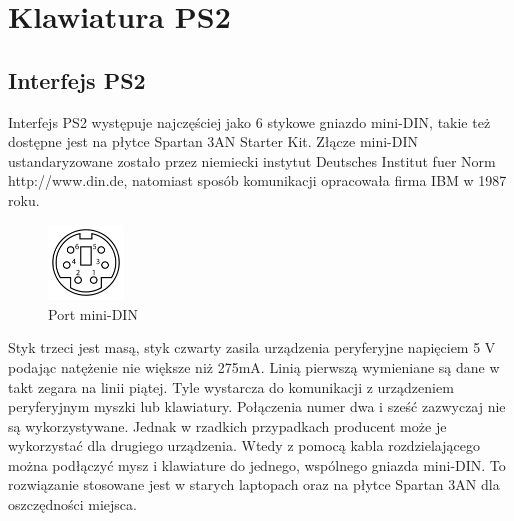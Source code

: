 \documentclass[a4paper,12pt]{article}
\begin{document}



\newpage
\section{Klawiatura PS2}

\subsection{Interfejs PS2}

Interfejs PS2 występuje najczęściej jako 6 stykowe gniazdo mini-DIN, takie też dostępne jest na płytce Spartan 3AN Starter Kit. Złącze mini-DIN ustandaryzowane zostało przez niemiecki instytut Deutsches Institut fuer Norm http://www.din.de, natomiast sposób komunikacji opracowała firma IBM w 1987 roku.

\begin{figure}[htb]
   \centering
   \includegraphics[width=2cm]{grafika/150px-MiniDIN-6_Connector_Pinout.png}
   \caption{Port mini-DIN}
\end{figure}

Styk trzeci jest masą, styk czwarty zasila urządzenia peryferyjne napięciem 5 V podając natężenie nie większe niż 275mA. Linią pierwszą wymieniane są dane w takt zegara na linii piątej. Tyle wystarcza do komunikacji z urządzeniem peryferyjnym myszki lub klawiatury. Połączenia numer dwa i sześć zazwyczaj nie są wykorzystywane. Jednak w rzadkich przypadkach producent może je wykorzystać dla drugiego urządzenia. Wtedy z pomocą kabla rozdzielającego można podłączyć mysz i klawiature do jednego, wspólnego gniazda mini-DIN. To rozwiązanie stosowane jest w starych laptopach oraz na płytce Spartan 3AN dla oszczędności miejsca.
\end{document}
